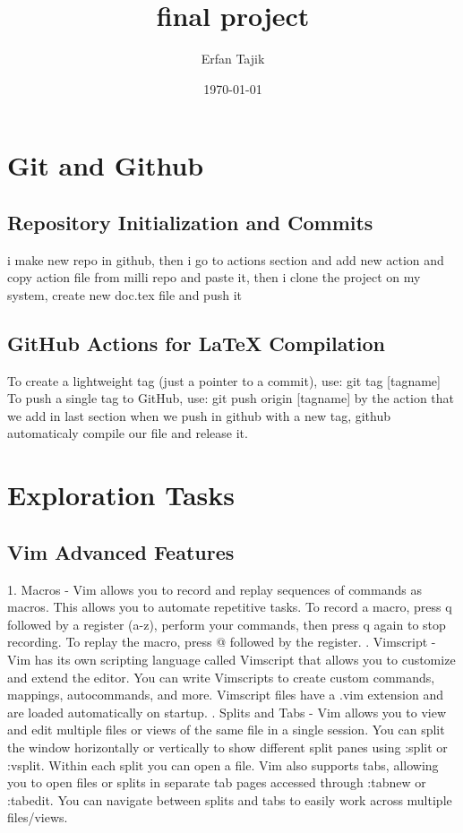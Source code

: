 \documentclass [ titlepage ]{article}
\title{final project}
\author{Erfan Tajik}
\date{\today}
\begin{document}
\maketitle

\tableofcontents
\newpage

\section{Git and Github}
\subsection{ Repository Initialization and Commits}
i make new repo in github, then i go to actions section and add new action and copy action file from milli repo and paste it,
then i clone the project on my system, create new doc.tex file and push it

\subsection{GitHub Actions for LaTeX Compilation}
To create a lightweight tag (just a pointer to a commit), use: \newline
\textdollar git tag [tagname] \newline 
To push a single tag to GitHub, use: \newline
\textdollar git push origin [tagname] \newline
by the action that we add in last section when we push in github with a new tag, github automaticaly compile our file and release it.


\section{Exploration Tasks}
\subsection{ Vim Advanced Features}
1. Macros - Vim allows you to record and replay sequences of commands as macros. This allows you to automate repetitive tasks. To record a
 macro, press q followed by a register (a-z), perform your commands, then press q again to stop recording. To replay the macro, press @
 followed by the register. \newline {}. Vimscript - Vim has its own scripting language called Vimscript that allows you to customize and extend the editor. You can write Vimscripts
 to create custom commands, mappings, autocommands, and more. Vimscript files have a .vim extension and are loaded automatically on
 startup. \newline {}. Splits and Tabs - Vim allows you to view and edit multiple files or views of the same file in a single session. You can split the window
 horizontally or vertically to show different split panes using :split or :vsplit. Within each split you can open a file. Vim also supports tabs,
 allowing you to open files or splits in separate tab pages accessed through :tabnew or :tabedit. You can navigate between splits and tabs to
 easily work across multiple files/views.
\end{document}
